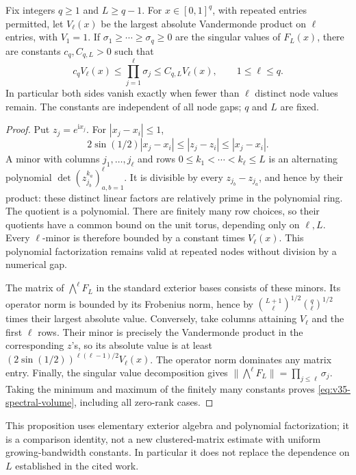 \begin{proposition}
\label{prop:v35-exterior-spectrum}
Fix integers $q\ge1$ and $L\ge q-1$. For $x\in[0,1]^q$, with
repeated entries permitted, let $V_\ell(x)$ be the largest absolute
Vandermonde product on $\ell$ entries, with $V_1=1$. If
$\sigma_1\ge\cdots\ge\sigma_q\ge0$ are the singular values of
$F_L(x)$, there are constants $c_q,C_{q,L}>0$ such that
\begin{equation}\label{eq:v35-spectral-volume}
 c_q V_\ell(x)\le\prod_{j=1}^{\ell}\sigma_j
          \le C_{q,L}V_\ell(x),\qquad 1\le\ell\le q.
\end{equation}
In particular both sides vanish exactly when fewer than $\ell$
distinct node values remain. The constants are independent of all
node gaps; $q$ and $L$ are fixed.
\end{proposition}
\begin{proof}
Put $z_j=e^{\mathrm i x_j}$. For $|x_j-x_i|\le1$,
\[
 2\sin(1/2)|x_j-x_i|\le |z_j-z_i|\le |x_j-x_i|.
\]
A minor with columns $j_1,\ldots,j_\ell$ and rows
$0\le k_1<\cdots<k_\ell\le L$ is an alternating polynomial
$\det(z_{j_b}^{k_a})_{a,b=1}^{\ell}$. It is divisible by every
$z_{j_b}-z_{j_a}$, and hence by their product: these distinct linear
factors are relatively prime in the polynomial ring. The quotient
is a polynomial. There are finitely many row choices, so their
quotients have a common bound on the unit torus, depending only on
$\ell,L$. Every $\ell$-minor is therefore bounded by a constant
times $V_\ell(x)$. This polynomial factorization remains valid
at repeated nodes without division by a numerical gap.

The matrix of $\bigwedge^\ell F_L$ in the standard exterior bases
consists of these minors. Its operator norm is bounded by its
Frobenius norm, hence by
$\binom{L+1}{\ell}^{1/2}\binom q\ell^{1/2}$ times their largest
absolute value. Conversely, take columns attaining $V_\ell$ and
the first $\ell$ rows. Their minor is precisely the Vandermonde
product in the corresponding $z$'s, so its absolute value is at
least $(2\sin(1/2))^{\ell(\ell-1)/2}V_\ell(x)$.
The operator norm dominates any matrix entry. Finally, the singular
value decomposition gives
$\|\bigwedge^\ell F_L\|=\prod_{j\le\ell}\sigma_j$.
Taking the minimum and maximum of the finitely many constants proves
\eqref{eq:v35-spectral-volume}, including all zero-rank cases.
\end{proof}

This proposition uses elementary exterior algebra and polynomial
factorization; it is a comparison identity, not a new clustered-matrix
estimate with uniform growing-bandwidth constants. In particular it
does not replace the dependence on $L$ established in the cited work.

